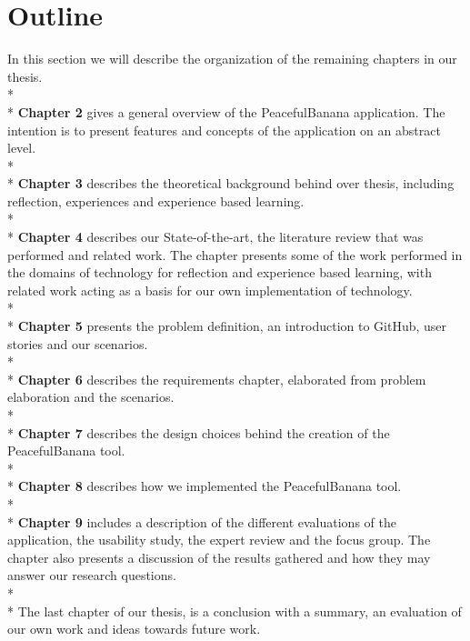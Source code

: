 

\section{Outline}
In this section we will describe the organization of the remaining chapters in our thesis. 
\\*
\\*
\textbf{Chapter 2} gives a general overview of the PeacefulBanana application. The intention is to present features and concepts of the application on an abstract level.
\\*
\\*
\textbf{Chapter 3} describes the theoretical background behind over thesis, including reflection, experiences and experience based learning. 
\\*
\\*
\textbf{Chapter 4} describes our State-of-the-art, the literature review that was performed and related work. The chapter presents some of the work performed in the domains of technology for reflection and experience based learning, with related work acting as a basis for our own implementation of technology. 
\\*
\\*
\textbf{Chapter 5} presents the problem definition, an introduction to GitHub, user stories and our scenarios. 
\\*
\\*
\textbf{Chapter 6} describes the requirements chapter, elaborated from problem elaboration and the scenarios. 
\\*
\\*
\textbf{Chapter 7} describes the design choices behind the creation of the PeacefulBanana tool.
\\*
\\*
\textbf{Chapter 8} describes how we implemented the PeacefulBanana tool. 
\\*
\\*
\textbf{Chapter 9} includes a description of the different evaluations of the application, the usability study, the expert review and the focus group. The chapter also presents a discussion of the results gathered and how they may answer our research questions.
\\*
\\*
The last chapter of our thesis, is a conclusion with a summary, an evaluation of our own work and ideas towards future work.